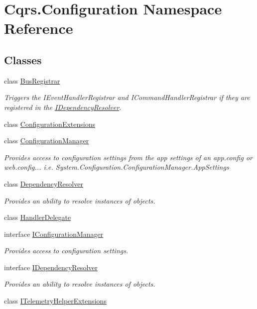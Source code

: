 \hypertarget{namespaceCqrs_1_1Configuration}{}\section{Cqrs.\+Configuration Namespace Reference}
\label{namespaceCqrs_1_1Configuration}
\subsection*{Classes}
\begin{DoxyCompactItemize}
\item 
class \hyperlink{classCqrs_1_1Configuration_1_1BusRegistrar}{Bus\+Registrar}
\begin{DoxyCompactList}\small\item\em Triggers the I\+Event\+Handler\+Registrar and I\+Command\+Handler\+Registrar if they are registered in the \hyperlink{interfaceCqrs_1_1Configuration_1_1IDependencyResolver}{I\+Dependency\+Resolver}. \end{DoxyCompactList}\item 
class \hyperlink{classCqrs_1_1Configuration_1_1ConfigurationExtensions}{Configuration\+Extensions}
\item 
class \hyperlink{classCqrs_1_1Configuration_1_1ConfigurationManager}{Configuration\+Manager}
\begin{DoxyCompactList}\small\item\em Provides access to configuration settings from the app settings of an app.\+config or web.\+config... i.\+e. System.\+Configuration.\+Configuration\+Manager.\+App\+Settings \end{DoxyCompactList}\item 
class \hyperlink{classCqrs_1_1Configuration_1_1DependencyResolver}{Dependency\+Resolver}
\begin{DoxyCompactList}\small\item\em Provides an ability to resolve instances of objects. \end{DoxyCompactList}\item 
class \hyperlink{classCqrs_1_1Configuration_1_1HandlerDelegate}{Handler\+Delegate}
\item 
interface \hyperlink{interfaceCqrs_1_1Configuration_1_1IConfigurationManager}{I\+Configuration\+Manager}
\begin{DoxyCompactList}\small\item\em Provides access to configuration settings. \end{DoxyCompactList}\item 
interface \hyperlink{interfaceCqrs_1_1Configuration_1_1IDependencyResolver}{I\+Dependency\+Resolver}
\begin{DoxyCompactList}\small\item\em Provides an ability to resolve instances of objects. \end{DoxyCompactList}\item 
class \hyperlink{classCqrs_1_1Configuration_1_1ITelemetryHelperExtensions}{I\+Telemetry\+Helper\+Extensions}
\end{DoxyCompactItemize}
